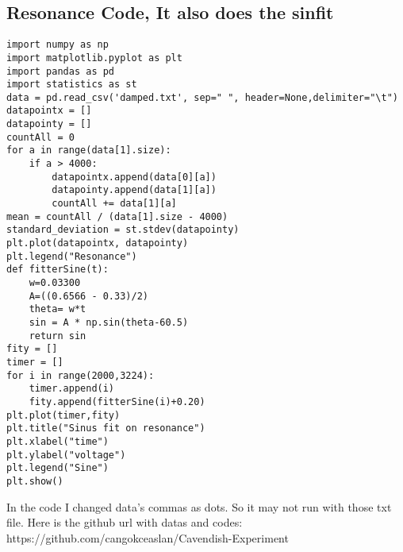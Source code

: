 \documentclass[12pt]{article}
\begin{document}
\subsection{Resonance Code, It also does the sinfit}
\begin{lstlisting}
import numpy as np
import matplotlib.pyplot as plt
import pandas as pd
import statistics as st
data = pd.read_csv('damped.txt', sep=" ", header=None,delimiter="\t")
datapointx = []
datapointy = []
countAll = 0
for a in range(data[1].size):
    if a > 4000:
        datapointx.append(data[0][a])
        datapointy.append(data[1][a])
        countAll += data[1][a]
mean = countAll / (data[1].size - 4000)
standard_deviation = st.stdev(datapointy)
plt.plot(datapointx, datapointy)
plt.legend("Resonance")
def fitterSine(t):
    w=0.03300
    A=((0.6566 - 0.33)/2)
    theta= w*t
    sin = A * np.sin(theta-60.5)
    return sin 
fity = []
timer = []
for i in range(2000,3224):
    timer.append(i)
    fity.append(fitterSine(i)+0.20)
plt.plot(timer,fity)
plt.title("Sinus fit on resonance")
plt.xlabel("time")
plt.ylabel("voltage")
plt.legend("Sine")
plt.show()

\end{lstlisting}
In the code I changed data's commas as dots. So it may not run with those txt file.  Here is the github url with datas and codes:
https://github.com/cangokceaslan/Cavendish-Experiment
\end{document}
